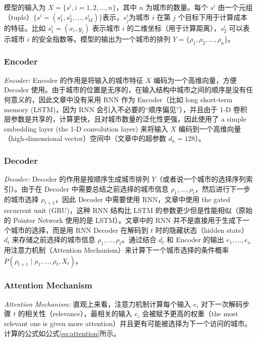 \documentclass[fontset=none]{ctexart}
\begin{document}
模型的输入为 $X = \{s^i, i = 1, 2, \ldots, n\}$，其中 $n$ 为城市的数量。每个 $s^i$ 由一个元组（tuple）$\{s^i = (s^i_1, s^i_2, \ldots, s^i_M)\}$表示，$s^i_j$为城市 $i$ 在第 $j$ 个目标下用于计算成本的特征。比如 $s^i_1 = (x_i, y_i)$ 表示城市 $i$ 的二维坐标（用于计算距离），$s^i_2$ 可以表示城市 $i$ 的安全指数等。模型的输出为一个城市的排列 $Y = \{\rho_1, \rho_2, \ldots, \rho_n\}$。

\subsubsection{Encoder}

\textit{Encoder:} Encoder 的作用是将输入的城市特征 $X$ 编码为一个高维向量，方便 Decoder 使用。由于城市的位置是无序的，在输入结构中城市之间的顺序是没有任何意义的，因此文章中没有采用 RNN 作为 Encoder（比如 long short-term memory (LSTM)，因为 RNN 会引入不必要的“顺序偏见”），并且由于 1-D 卷积层参数是共享的，计算更快，且对城市数量的泛化性更强，因此使用了 a simple embedding layer (the 1-D convolution layer) 来将输入 $X$ 编码到一个高维向量（high-dimensional vector）空间中\cite{nazariReinforcementLearningSolving2018}（文章中的超参数 $d_h = 128$）。

\subsubsection{Decoder}

\textit{Decoder:} Decoder 的作用是按顺序生成城市排列 $Y$（或者说一个城市的选择序列索引）。由于在 Decoder 中需要总结之前选择的城市信息 $\rho_1, \ldots, \rho_t$，然后进行下一步的城市选择 $\rho_{t + 1}$，因此 Decoder 中需要使用 RNN，文章中使用 the gated recurrent unit (GRU)\cite{choLearningPhraseRepresentations2014}，这种 RNN 结构比 LSTM 的参数更少但是性能相似（原始的 Pointer Network 使用的是 LSTM\cite{nazariReinforcementLearningSolving2018}）。文章中的 RNN 并不是直接用于生成下一个城市的选择，而是用 RNN Decoder 在解码到 $t$ 时的隐藏状态（hidden state）$d_t$ 来存储之前选择的城市信息 $\rho_1, \ldots, \rho_t$。通过结合 $d_t$ 和 Encoder 的输出 $e_1,\ldots, e_n$ 用注意力机制（Attention Mechanism）来计算下一个城市选择的条件概率 $P(\rho_{t + 1} \mid \rho_1, \ldots, \rho_t, X_t)$。

\subsubsection{Attention Mechanism}

\textit{Attention Mechanism:} 直观上来看，注意力机制计算每个输入 $e_i$ 对下一次解码步骤 $t$ 的相关性（relevance），最相关的输入 $e_i$ 会被赋予更高的权重（the most relevant one is given more attention）并且更有可能被选择为下一个访问的城市。计算的公式如公式\cref{eq:attention}所示。
\end{document}
